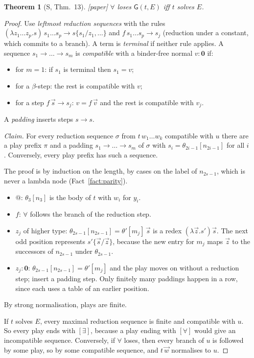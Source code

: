 \documentclass[11pt]{article}
\newcommand{\Ground}{\mathbf{0}}
\newcommand{\Gm}{\mathsf{G}}
\newcommand{\Paper}{\textsf{[paper]}}
\theoremstyle{plain}
\newtheorem{theorem}{Theorem}[section]
\theoremstyle{definition}
\theoremstyle{remark}
\begin{document}
\begin{theorem}[S, Thm.~13]\label{thm:game}
\Paper{} $\forall$ loses $\Gm(t,E)$ iff $t$ solves $E$.
\end{theorem}
\begin{proof}
Use \emph{leftmost reduction sequences} with the rules
$(\lambda z_1\dots z_p.s)\,s_1\dots s_p\to s\{s_1/z_1,\dots\}$ and
$f\,s_1\dots s_p\to s_j$ (reduction under a constant, which commits to a
branch).  A term is \emph{terminal} if neither rule applies.  A sequence
$s_1\to\dots\to s_m$ is \emph{compatible} with a binder-free normal
$v:\Ground$ if:
\begin{itemize}
\item for $m=1$: if $s_1$ is terminal then $s_1=v$;
\item for a $\beta$-step: the rest is compatible with $v$;
\item for a step $f\,\vec s\to s_j$: $v=f\,\vec v$ and the rest is
  compatible with $v_j$.
\end{itemize}
A \emph{padding} inserts steps $s\to s$.

\emph{Claim.} For every reduction sequence $\sigma$ from
$t\,w_1\dots w_k$ compatible with $u$ there are a play prefix $\pi$ and
a padding $s_1\to\dots\to s_m$ of $\sigma$ with
$s_i=\theta_{2i-1}[n_{2i-1}]$ for all $i$.  Conversely, every play prefix
has such a sequence.

The proof is by induction on the length, by cases on the label of
$n_{2s-1}$, which is never a lambda node (Fact~\ref{fact:parity}).
\begin{itemize}
\item $@$: $\theta_3[n_3]$ is the body of $t$ with $w_i$ for $y_i$.
\item $f$: $\forall$ follows the branch of the reduction step.
\item $z_j$ of higher type: $\theta_{2s-1}[n_{2s-1}]=\theta'[m_j]\,\vec s$
  is a redex $(\lambda\vec z.s')\vec s$.  The next odd position
  represents $s'\{\vec s/\vec z\}$, because the new entry for $m_j$ maps
  $\vec z$ to the successors of $n_{2s-1}$ under $\theta_{2s-1}$.
\item $z_j:\Ground$: $\theta_{2s-1}[n_{2s-1}]=\theta'[m_j]$ and the play
  moves on without a reduction step; insert a padding step.  Only
  finitely many paddings happen in a row, since each uses a table of
  an earlier position.
\end{itemize}
By strong normalisation, plays are finite.

If $t$ solves $E$, every maximal reduction sequence is finite and
compatible with $u$.  So every play ends with $[\exists]$, because a
play ending with $[\forall]$ would give an incompatible sequence.
Conversely, if $\forall$ loses, then every branch of $u$ is followed by
some play, so by some compatible sequence, and $t\,\vec w$ normalises to
$u$.
\end{proof}
\end{document}
